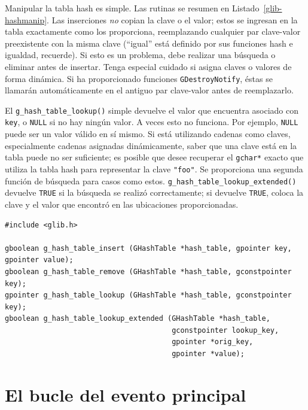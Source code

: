 Manipular la tabla hash es simple. Las rutinas se resumen en Listado~\ref{glib-hashmanip}. Las inserciones \emph{no} copian la clave o el valor; estos se ingresan en la tabla exactamente como los proporciona, reemplazando cualquier par clave-valor preexistente con la misma clave (``igual'' está definido por sus funciones hash e igualdad, recuerde). Si esto es un problema, debe realizar una búsqueda o eliminar antes de insertar. Tenga especial cuidado si asigna claves o valores de forma dinámica. Si ha proporcionado funciones \lstinline{GDestroyNotify}, éstas se llamarán automáticamente en el antiguo par clave-valor antes de reemplazarlo.

El \lstinline{g_hash_table_lookup()} simple devuelve el valor que encuentra asociado con \lstinline{key}, o \lstinline{NULL} si no hay ningún valor. A veces esto no funciona. Por ejemplo, \lstinline{NULL} puede ser un valor válido en sí mismo. Si está utilizando cadenas como claves, especialmente cadenas asignadas dinámicamente, saber que una clave está en la tabla puede no ser suficiente; es posible que desee recuperar el \lstinline{gchar*} exacto que utiliza la tabla hash para representar la clave \lstinline{"foo"}. Se proporciona una segunda función de búsqueda para casos como estos. \lstinline{g_hash_table_lookup_extended()} devuelve \lstinline{TRUE} si la búsqueda se realizó correctamente; si devuelve \lstinline{TRUE}, coloca la clave y el valor que encontró en las ubicaciones proporcionadas.

\begin{lstlisting}[float, caption={Manipulating a \lstinline{GHashTable}}, label=glib-hashmanip]
#include <glib.h>

gboolean g_hash_table_insert (GHashTable *hash_table, gpointer key, gpointer value);
gboolean g_hash_table_remove (GHashTable *hash_table, gconstpointer key);
gpointer g_hash_table_lookup (GHashTable *hash_table, gconstpointer key);
gboolean g_hash_table_lookup_extended (GHashTable *hash_table,
                                       gconstpointer lookup_key,
                                       gpointer *orig_key,
                                       gpointer *value);
\end{lstlisting}

\section{El bucle del evento principal}
\label{glib-main-event-loop}

